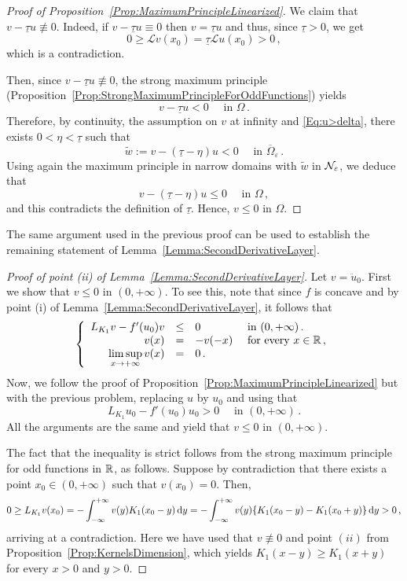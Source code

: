 \begin{proof}[Proof of Proposition~\ref{Prop:MaximumPrincipleLinearized}]
	We claim that $v - \underline{\tau} u \not \equiv 0$. Indeed, if $v - \underline{\tau} u \equiv 0$ then $v = \underline{\tau} u$ and thus, since $\underline{\tau} > 0$, we get 
	$$
	0 \geq \mathscr{L} v(x_0) = \underline{\tau} \mathscr{L} u(x_0) > 0\,, 
	$$
	which is a contradiction.
	
	Then, since $v - \underline{\tau} u \not \equiv 0$, the strong maximum principle (Proposition~\ref{Prop:StrongMaximumPrincipleForOddFunctions}) yields
	$$
	v - \underline{\tau} u < 0 \quad \textrm{ in }\Omega\,.
	$$
	Therefore, by continuity, the assumption on $v$ at infinity and \eqref{Eq:u>delta}, there exists $0 < \eta <\underline{\tau}$ such that 
	$$
	\tilde{w} := v - (\underline{\tau} - \eta) u < 0 \quad \textrm{ in }\overline{\Omega}_\varepsilon\,.
	$$
	Using again the maximum principle in narrow domains with $\tilde{w}$ in $\mathcal{N}_\varepsilon$, we deduce that 
	$$
	v - (\underline{\tau} - \eta) u \leq 0 \quad \textrm{ in }\Omega\,,
	$$
	and this contradicts the definition of $\underline{\tau}$. Hence, $v\leq 0$ in $\Omega$.
\end{proof}


The same argument used in the previous proof can be used to establish the remaining statement of Lemma~\ref{Lemma:SecondDerivativeLayer}.

\begin{proof}[Proof of point (ii) of Lemma~\ref{Lemma:SecondDerivativeLayer}]
	
	Let $v = \ddot{u}_0$. First we show that $v\leq 0$ in $(0,+\infty)$. To see this, note that since $f$ is concave and by point (i) of Lemma~\ref{Lemma:SecondDerivativeLayer}, it follows that
	$$
	\left\{\begin{array}{rcll}
	L_{K_1} v - f'(u_0)v &\leq &0 & \text{ in } (0,+\infty)\,.\\
	v(x) &= &-v(-x) & \text{ for every } x\in \mathbb{R}\,,\\
	\displaystyle \limsup_{x\to +\infty} v(x) &= & 0\,.
	\end{array} \right.
	$$
	Now, we follow the proof of Proposition~\ref{Prop:MaximumPrincipleLinearized} but with the previous problem, replacing $u$ by $u_0$ and using that
	$$
	L_{K_1} u_0 - f'(u_0)u_0 > 0 \quad \text{ in } (0,+\infty)\,. 
	$$
	All the arguments are the same and yield that $v\leq 0$ in $(0,+\infty)$.
	
	The fact that the inequality is strict follows from the strong maximum principle for odd functions in $\mathbb{R}$, as follows. Suppose by contradiction that there exists a point $x_0\in (0,+\infty)$ such that $v(x_0) = 0$. Then,
	$$
	0 \geq L_{K_1} v (x_0) = - \int_{-\infty}^{+\infty}	v(y) K_1(x_0 - y) \,\mathrm{d} y = - \int_{-\infty}^{+\infty} v(y) \{ K_1(x_0 - y) - K_1(x_0 + y)\} \,\mathrm{d} y > 0\,,$$
	arriving at a contradiction. Here we have used that $v\not \equiv 0$ and point $(ii)$ from Proposition~\ref{Prop:KernelsDimension}, which yields $K_1(x - y) \geq  K_1(x + y)$ for every $x>0$ and $y>0$.
\end{proof}






